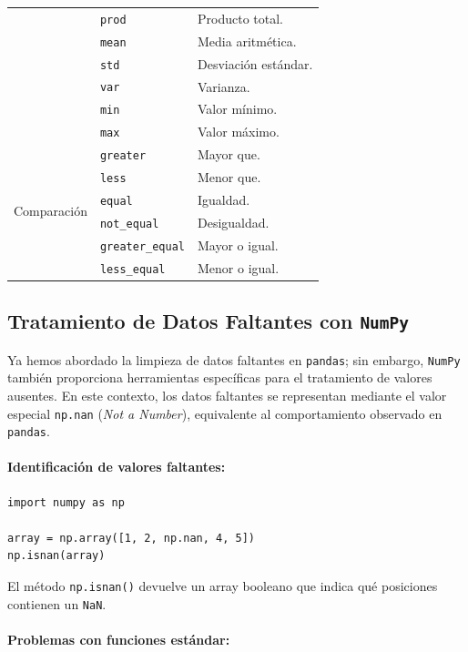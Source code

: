 \documentclass{article}
\theoremstyle{nonumberplain}
\begin{document}
\begin{center}
\begin{longtable}{|p{4cm}|p{3.5cm}|p{7cm}|}
& \texttt{prod} & Producto total. \\
& \texttt{mean} & Media aritmética. \\
& \texttt{std} & Desviación estándar. \\
& \texttt{var} & Varianza. \\
& \texttt{min} & Valor mínimo. \\
& \texttt{max} & Valor máximo. \\
\hline
\multirow{6}{*}{Comparación} & \texttt{greater} & Mayor que. \\
& \texttt{less} & Menor que. \\
& \texttt{equal} & Igualdad. \\
& \texttt{not\_equal} & Desigualdad. \\
& \texttt{greater\_equal} & Mayor o igual. \\
& \texttt{less\_equal} & Menor o igual. \\
\hline
\end{longtable}
\end{center}

\subsection*{Tratamiento de Datos Faltantes con \texttt{NumPy}}

Ya hemos abordado la limpieza de datos faltantes en \texttt{pandas}; sin embargo, \texttt{NumPy} también proporciona herramientas específicas para el tratamiento de valores ausentes. En este contexto, los datos faltantes se representan mediante el valor especial \texttt{np.nan} (\textit{Not a Number}), equivalente al comportamiento observado en \texttt{pandas}.

\paragraph{Identificación de valores faltantes:}

\begin{verbatim}
import numpy as np

array = np.array([1, 2, np.nan, 4, 5])
np.isnan(array)
\end{verbatim}

El método \texttt{np.isnan()} devuelve un array booleano que indica qué posiciones contienen un \texttt{NaN}.

\paragraph{Problemas con funciones estándar:}
\end{document}
